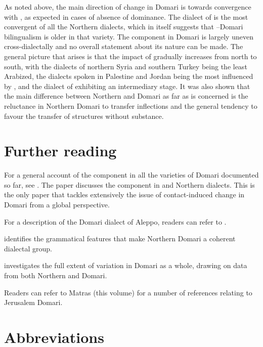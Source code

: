 \documentclass[output=paper]{langsci/langscibook}
\begin{document}
As noted above, the main direction of change in Domari is towards {convergence} with , as expected in cases of absence of dominance. The dialect of  is the most convergent of all the Northern dialects, which in itself suggests that --Domari {bilingualism} is older in that variety. The  component in Domari is largely uneven cross-dialectally and no overall statement about its nature can be made. The general picture that arises is that the impact of  gradually increases from north to south, with the dialects of northern Syria and southern Turkey being the least Arabized, the  dialects spoken in Palestine and Jordan being the most influenced by , and the dialect of  exhibiting an intermediary stage. It was also shown that the main difference between Northern and  Domari as far as  is concerned is the reluctance in Northern Domari to {transfer}  inflections and the general tendency to favour the {transfer} of structures without substance.

\section*{Further reading}

For a general account of the  component in all the varieties of Domari documented so far, see \citet{Herin2018}. The paper discusses the  component in  and Northern dialects. This is the only paper that tackles extensively the issue of contact-induced change in Domari from a global perspective.

For a description of the Domari dialect of Aleppo, readers can refer to \citet{Herin2012}.

\begin{furtherreading}
\item[\citet{Herin2014Domari}] identifies the grammatical features that make Northern Domari a coherent dialectal group.
\item[\citet{Herin2016}] investigates the full extent of variation in Domari as a whole, drawing on data from both Northern and  Domari.
\end{furtherreading}

Readers can refer to Matras (this volume) for a number of references relating to {Jerusalem Domari}.

\section*{Abbreviations}
\end{document}
